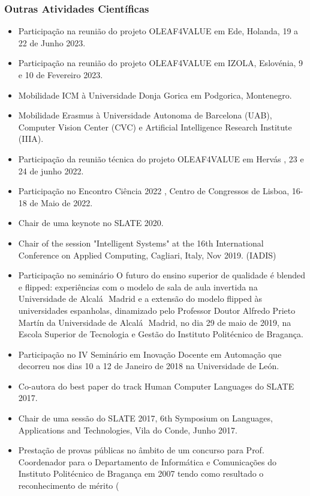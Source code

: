 \documentclass[11pt]{article}
\begin{document}
\subsubsection{Outras Atividades Científicas} 
\begin{itemize}
\item{Participação na reunião do projeto OLEAF4VALUE em Ede, Holanda, 19 a 22 de Junho 2023.}
\item{Participação na reunião do projeto OLEAF4VALUE em IZOLA, Eslovénia, 9 e 10 de Fevereiro 2023.}
\item{Mobilidade ICM à Universidade Donja Gorica em Podgorica, Montenegro.}
\item{Mobilidade Erasmus à Universidade Autonoma de Barcelona (UAB),  Computer Vision Center (CVC) e Artificial Intelligence Research Institute (IIIA).}
\item{Participação da reunião técnica do projeto OLEAF4VALUE em Hervás , 23 e 24 de junho 2022.}
\item{Participação no Encontro Ciência 2022 , Centro de Congressos de Lisboa, 16-18 de Maio de 2022.}
\item{Chair de uma keynote no SLATE 2020.}
\item{Chair of the session "Intelligent Systems" at the 16th International Conference on Applied Computing, Cagliari, Italy, Nov 2019. (IADIS)}
\item{Participação no seminário O futuro do ensino superior de qualidade é blended e flipped: experiências com o modelo de sala de aula invertida na Universidade de Alcalá  Madrid e a extensão do modelo flipped às universidades espanholas, dinamizado pelo Professor Doutor Alfredo Prieto Martín da Universidade de Alcalá  Madrid, no dia 29 de maio de 2019, na Escola Superior de Tecnologia e Gestão do Instituto Politécnico de Bragança.}
\item{Participação no IV Seminário em Inovação Docente em Automação que decorreu nos dias 10 a 12 de Janeiro de 2018 na Universidade de León.}
\item{Co-autora do best paper do track Human Computer Languages do SLATE 2017.}
\item{Chair de uma sessão do SLATE 2017, 6th Symposium on Languages, Applications and Technologies, Vila do Conde, Junho 2017.}
\item{Prestação de provas públicas no âmbito de um concurso para Prof. Coordenador para o Departamento de Informática e Comunicações do Instituto Politécnico de Bragança em 2007 tendo como resultado o reconhecimento de mérito (
}
\end{itemize}
\end{document}
